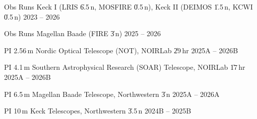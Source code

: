 


\begin{cventries}

\cvsimpentry
    {Obs Runs}
    {Keck I (LRIS \| 6.5\,n, MOSFIRE \| 0.5\,n), Keck II (DEIMOS \| 1.5\,n, KCWI \| 0.5\,n)}
    {2023 -- 2026}
    {}

\cvsimpentry
    {Obs Runs}
    {Magellan Baade (FIRE \| 3\,n)}
    {2025 -- 2026}
    {}


\cvsimpentry
    {PI}
    {2.56\,m Nordic Optical Telescope (NOT), NOIRLab \| 29\,hr}
    {2025A -- 2026B}
    {}

\cvsimpentry
    {PI}
    {4.1\,m Southern Astrophysical Research (SOAR) Telescope, NOIRLab \| 17\,hr}
    {2025A -- 2026B}
    {}
    
\cvsimpentry
    {PI}
    {6.5\,m Magellan Baade Telescope, Northwestern \| 3\,n}
    {2025A -- 2026A}
    {}
    
\cvsimpentry
    {PI}
    {10\,m Keck Telescopes, Northwestern \| 3.5\,n}
    {2024B -- 2025B}
    {}









\end{cventries}
